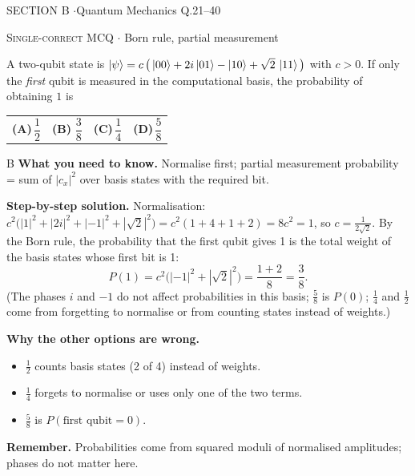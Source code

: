 \documentclass[11pt,a4paper]{article}
\newcommand{\optlabel}[1]{\textbf{(#1)}}
\newcommand{\correctlabel}[1]{\textcolor{okgreen}{\textbf{(#1)}\,\ding{51}}}
\newenvironment{qitem}[1]{\begin{list}{}{\setlength{\leftmargin}{3.3em}\setlength{\labelwidth}{3.1em}%
  \setlength{\labelsep}{0.2em}\setlength{\topsep}{3pt}\setlength{\parsep}{3pt}}\item[\textbf{Q.#1}\hfill]}{\end{list}}
\newcommand{\qsep}{\par\vspace{2pt}{\color{black!15}\hrule}\vspace{4pt}}
\newcommand{\qmeta}[2]{{\footnotesize\color{black!60}\textsc{#1} \;$\cdot$\; #2}\par}
\begin{document}
\newpage

\begin{sectionbanner}SECTION B \enspace$\cdot$\enspace Quantum Mechanics \hfill Q.21--40\end{sectionbanner}

\begin{qitem}{21}
\qmeta{Single-correct MCQ}{Born rule, partial measurement}
A two-qubit state is $\ket{\psi} = c\,\big(\ket{00} + 2i\ket{01} - \ket{10} + \sqrt2\,\ket{11}\big)$ with $c > 0$.
If only the \emph{first} qubit is measured in the computational basis, the probability of obtaining $1$ is
\par\smallskip\noindent\begin{tabularx}{\linewidth}{@{}*{4}{L}@{}}
\optlabel{A}\,$\dfrac12$ & \correctlabel{B}\,$\dfrac38$ & \optlabel{C}\,$\dfrac14$ & \optlabel{D}\,$\dfrac58$
\end{tabularx}
\end{qitem}
\begin{solbox}{B}
\textbf{\color{brand}What you need to know.} Normalise first; partial measurement probability = sum of $|c_x|^2$ over basis states with the required bit.

\textbf{\color{brand}Step-by-step solution.} Normalisation: $c^2\big(|1|^2 + |2i|^2 + |-1|^2 + |\sqrt2|^2\big) = c^2(1 + 4 + 1 + 2) = 8c^2 = 1$, so $c = \frac{1}{2\sqrt2}$.
By the Born rule, the probability that the first qubit gives 1 is the total weight of the basis states whose first bit is 1:
\[ P(1) = c^2\big(|-1|^2 + |\sqrt2|^2\big) = \frac{1 + 2}{8} = \frac38 . \]
(The phases $i$ and $-1$ do not affect probabilities in this basis; $\frac58$ is $P(0)$; $\frac14$ and $\frac12$ come from
forgetting to normalise or from counting states instead of weights.)

\textbf{\color{brand}Why the other options are wrong.}
\begin{itemize}[leftmargin=2.4em, itemsep=1pt, topsep=2pt]
\item[\textbf{(A)}] $\frac12$ counts basis states (2 of 4) instead of weights.
\item[\textbf{(C)}] $\frac14$ forgets to normalise or uses only one of the two terms.
\item[\textbf{(D)}] $\frac58$ is $P(\text{first qubit} = 0)$.
\end{itemize}
\textbf{\color{brand}Remember.} Probabilities come from squared moduli of normalised amplitudes; phases do not matter here.
\end{solbox}
\qsep
\end{document}
